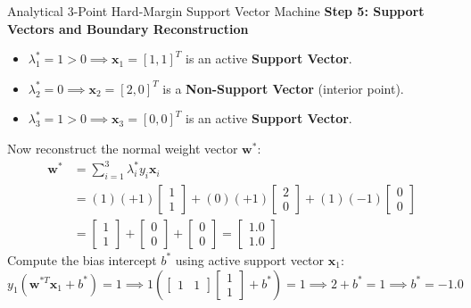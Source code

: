 \begin{examplebox}[breakable]{Analytical 3-Point Hard-Margin Support Vector Machine}
\textbf{Step 5: Support Vectors and Boundary Reconstruction}
\begin{itemize}
    \item $\lambda_1^* = 1 > 0 \implies \mathbf{x}_1 = [1, 1]^T$ is an active \textbf{Support Vector}.
    \item $\lambda_2^* = 0 \implies \mathbf{x}_2 = [2, 0]^T$ is a \textbf{Non-Support Vector} (interior point).
    \item $\lambda_3^* = 1 > 0 \implies \mathbf{x}_3 = [0, 0]^T$ is an active \textbf{Support Vector}.
\end{itemize}
Now reconstruct the normal weight vector $\mathbf{w}^*$:
\begin{align}
\mathbf{w}^* &= \sum_{i=1}^3 \lambda_i^* y_i \mathbf{x}_i \nonumber \\
&= (1)(+1)\begin{bmatrix} 1 \\ 1 \end{bmatrix} + (0)(+1)\begin{bmatrix} 2 \\ 0 \end{bmatrix} + (1)(-1)\begin{bmatrix} 0 \\ 0 \end{bmatrix} \nonumber \\
&= \begin{bmatrix} 1 \\ 1 \end{bmatrix} + \begin{bmatrix} 0 \\ 0 \end{bmatrix} + \begin{bmatrix} 0 \\ 0 \end{bmatrix} = \begin{bmatrix} 1.0 \\ 1.0 \end{bmatrix}
\end{align}
Compute the bias intercept $b^*$ using active support vector $\mathbf{x}_1$:
\begin{equation}
y_1(\mathbf{w}^{*T} \mathbf{x}_1 + b^*) = 1 \implies 1\left( \begin{bmatrix} 1 & 1 \end{bmatrix} \begin{bmatrix} 1 \\ 1 \end{bmatrix} + b^* \right) = 1 \implies 2 + b^* = 1 \implies b^* = -1.0

\end{equation}
\end{examplebox}
